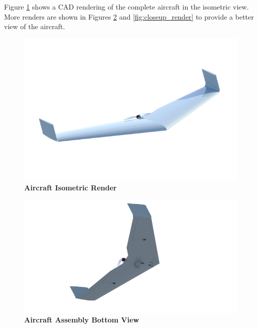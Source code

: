         Figure \ref{fig:iso_render} shows a CAD rendering of the complete aircraft in the isometric view. More renders are shown in Figures \ref{fig:bottom_render} and \ref{fig:closeup_render} to provide a better view of the aircraft.
          
        \begin{figure}[H]
            \centering
            \includegraphics[width=.9\textwidth]{homeworks/homework4/report/Figure/aircraft_assembly_front_iso.png}
            \caption{\textbf{Aircraft Isometric Render}}
            \label{fig:iso_render}
        \end{figure}
        
        \begin{figure}[H]
            \centering
            \includegraphics[width=1.1\textwidth]{homeworks/homework4/report/Figure/aircraft_assembly_2.png}
            \caption{\textbf{Aircraft Assembly Bottom View}}
            \label{fig:bottom_render}
        \end{figure}
        
